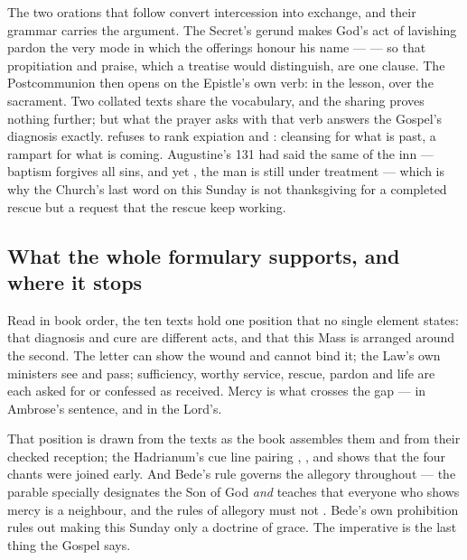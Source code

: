 The two orations that follow convert intercession into exchange, and their
grammar carries the argument. The Secret's gerund makes God's act of lavishing
pardon the very mode in which the offerings honour his name ---  --- so that
propitiation and praise, which a treatise would distinguish, are one clause.
The Postcommunion then opens on the Epistle's own verb:  in the lesson,  over the sacrament. Two
collated texts share the vocabulary, and the sharing proves nothing further;
but what the prayer asks with that verb answers the
Gospel's diagnosis exactly.  refuses to rank expiation and
: cleansing for what is past, a rampart for what is coming.
Augustine's  131 had said the same of the inn --- baptism forgives
all sins, and yet , the man is still under treatment ---
which is why the Church's last word on this Sunday is not thanksgiving for a
completed rescue but a request that the rescue keep working.

\subsection*{What the whole formulary supports, and where it stops}

Read in book order, the ten texts hold one position that no single element
states: that diagnosis and cure are different acts, and that this Mass is
arranged around the second. The letter can show the wound and cannot bind it;
the Law's own ministers see and pass; sufficiency, worthy service, rescue,
pardon and life are each asked for or confessed as received. Mercy is what
crosses the gap --- 
in Ambrose's sentence, and  in the Lord's.

That position is drawn from the texts as the book assembles them and from
their checked reception; the Hadrianum's cue line pairing , ,  and
 shows that the four chants were joined early. And
Bede's rule governs the
allegory throughout --- the parable specially designates the Son of God
\textit{and} teaches that everyone who shows mercy is a neighbour, and the
rules of allegory must not . Bede's own prohibition rules out making this
Sunday only a doctrine of grace. The imperative is the last thing the Gospel
says.
